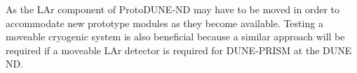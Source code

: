 As the LAr component of ProtoDUNE-ND may have to be moved in order to accommodate new prototype modules as they become available. Testing a moveable cryogenic system is also beneficial because a similar approach will be required if a moveable LAr detector is required for DUNE-PRISM at the DUNE ND.

